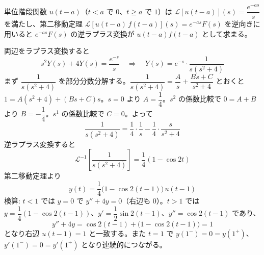 
単位階段関数 $u(t-a)$（$t<a$ で $0$、$t \ge a$ で $1$）は $\mathcal{L}[u(t-a)](s) = \dfrac{e^{-as}}{s}$ を満たし、第二移動定理 $\mathcal{L}[u(t-a)\,f(t-a)](s) = e^{-as} F(s)$ を逆向きに用いると $e^{-as}F(s)$ の逆ラプラス変換が $u(t-a)f(t-a)$ として求まる。

両辺をラプラス変換すると
\[
s^{2}Y(s) + 4Y(s) = \frac{e^{-s}}{s}
\quad\Longrightarrow\quad
Y(s) = e^{-s}\cdot\frac{1}{s(s^{2}+4)}
\]
まず $\dfrac{1}{s(s^{2}+4)}$ を部分分数分解する。$\dfrac{1}{s(s^{2}+4)} = \dfrac{A}{s} + \dfrac{Bs+C}{s^{2}+4}$ とおくと
$1 = A(s^{2}+4) + (Bs+C)s$。$s=0$ より $A = \dfrac{1}{4}$。$s^{2}$ の係数比較で $0 = A+B$ より $B=-\dfrac{1}{4}$。$s^{1}$ の係数比較で $C=0$。よって
\[
\frac{1}{s(s^{2}+4)} = \frac{1}{4}\cdot\frac{1}{s} - \frac{1}{4}\cdot\frac{s}{s^{2}+4}
\]
逆ラプラス変換すると
\[
\mathcal{L}^{-1}\!\left[\frac{1}{s(s^{2}+4)}\right] = \frac{1}{4}\left(1 - \cos 2t\right)
\]
第二移動定理より
\[
\boxed{\; y(t) = \frac{1}{4}\bigl(1 - \cos 2(t-1)\bigr)\,u(t-1) \;}
\]
検算: $t<1$ では $y=0$ で $y''+4y=0$（右辺も $0$）。$t>1$ では $y = \dfrac{1}{4}(1-\cos 2(t-1))$、$y' = \dfrac{1}{2}\sin 2(t-1)$、$y'' = \cos 2(t-1)$ であり、
\[
y''+4y = \cos 2(t-1) + \bigl(1-\cos 2(t-1)\bigr) = 1
\]
となり右辺 $u(t-1)=1$ と一致する。また $t=1$ で $y(1^{-})=0=y(1^{+})$、$y'(1^{-})=0=y'(1^{+})$ となり連続的につながる。

